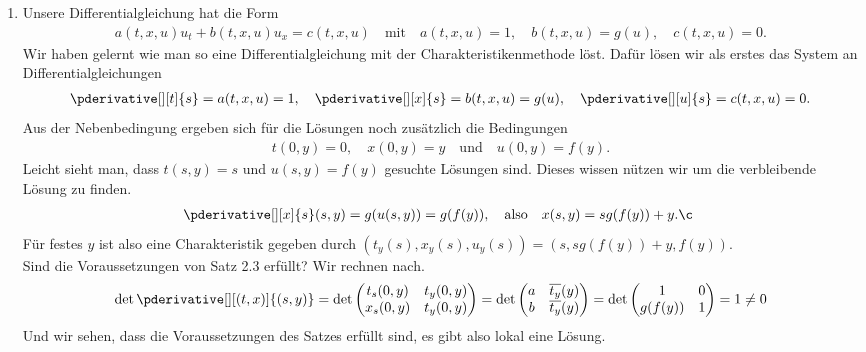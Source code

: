 \begin{solution}

\begin{enumerate}[label = (\roman*)]
	\item Unsere Differentialgleichung hat die Form 
	\begin{align*}
	a(t, x, u) u_t + b(t, x, u)u_x = c(t, x, u) \quad \text{mit} \quad a(t,x,u) = 1, \quad b(t,x,u) = g(u), \quad c(t,x,u) = 0.
	\end{align*}
	Wir haben gelernt wie man so eine Differentialgleichung mit der Charakteristikenmethode löst. Dafür lösen wir als erstes das System an Differentialgleichungen 
	\begin{align*}
	\pderivative[][t]{s} = a(t,x,u) = 1, \quad \pderivative[][x]{s} = b(t,x,u) = g(u), \quad \pderivative[][u]{s} = c(t,x,u) = 0.
	\end{align*}
	Aus der Nebenbedingung ergeben sich für die Lösungen noch zusätzlich die Bedingungen 
	\begin{align*}
	t(0,y) = 0, \quad x(0,y) = y \quad \text{und} \quad u(0,y) = f(y).
	\end{align*}
	Leicht sieht man, dass $t(s,y) = s$ und $u(s,y) = f(y)$ gesuchte Lösungen sind. Dieses wissen nützen wir um die verbleibende Lösung zu finden.
	\begin{align*}
	\pderivative[][x]{s}(s,y) = g(u(s,y)) = g(f(y)), \quad \text{also} \quad x(s,y) = sg(f(y)) + y.¸
	\end{align*}
	Für festes $y$ ist also eine Charakteristik gegeben durch $(t_y(s), x_y(s), u_y(s)) = (s, sg(f(y)) + y, f(y))$. \\
	Sind die Voraussetzungen von Satz 2.3 erfüllt? Wir rechnen nach.
	\begin{align*}
	\det \pderivative[][(t,x)]{(s,y)} = \det
	\begin{pmatrix}
	t_s(0,y) & t_y(0,y) \\
	x_s(0,y) & t_y(0,y)
	\end{pmatrix} 
	= \det
	\begin{pmatrix}
	a & \overline{t_y}(y) \\
	b & \overline{t_y}(y)
	\end{pmatrix} 
	= \det
	\begin{pmatrix}
	1 & 0 \\
	g(f(y)) & 1
	\end{pmatrix} 
	= 1 \neq 0
	\end{align*}
	Und wir sehen, dass die Voraussetzungen des Satzes erfüllt sind, es gibt also lokal eine Lösung.
	

\end{enumerate}
\end{solution}
